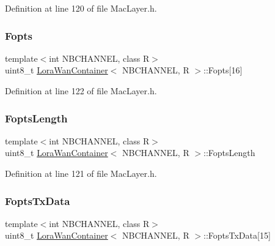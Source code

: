 Definition at line 120 of file Mac\+Layer.\+h.

\mbox{\label{class_lora_wan_container_a747eaf56824bd60202ffbd3126541e6a}} 
\subsubsection{\texorpdfstring{Fopts}{Fopts}}
{\footnotesize\ttfamily template$<$int N\+B\+C\+H\+A\+N\+N\+EL, class R$>$ \\
uint8\+\_\+t \mbox{\hyperlink{class_lora_wan_container}{Lora\+Wan\+Container}}$<$ N\+B\+C\+H\+A\+N\+N\+EL, R $>$\+::Fopts\mbox{[}16\mbox{]}}



Definition at line 122 of file Mac\+Layer.\+h.

\mbox{\label{class_lora_wan_container_a89564c8c68d7f3067c804c2d1034cd48}} 
\subsubsection{\texorpdfstring{Fopts\+Length}{FoptsLength}}
{\footnotesize\ttfamily template$<$int N\+B\+C\+H\+A\+N\+N\+EL, class R$>$ \\
uint8\+\_\+t \mbox{\hyperlink{class_lora_wan_container}{Lora\+Wan\+Container}}$<$ N\+B\+C\+H\+A\+N\+N\+EL, R $>$\+::Fopts\+Length}



Definition at line 121 of file Mac\+Layer.\+h.

\mbox{\label{class_lora_wan_container_aec4a26086022915f815f3ae0d03a8886}} 
\subsubsection{\texorpdfstring{Fopts\+Tx\+Data}{FoptsTxData}}
{\footnotesize\ttfamily template$<$int N\+B\+C\+H\+A\+N\+N\+EL, class R$>$ \\
uint8\+\_\+t \mbox{\hyperlink{class_lora_wan_container}{Lora\+Wan\+Container}}$<$ N\+B\+C\+H\+A\+N\+N\+EL, R $>$\+::Fopts\+Tx\+Data\mbox{[}15\mbox{]}}



